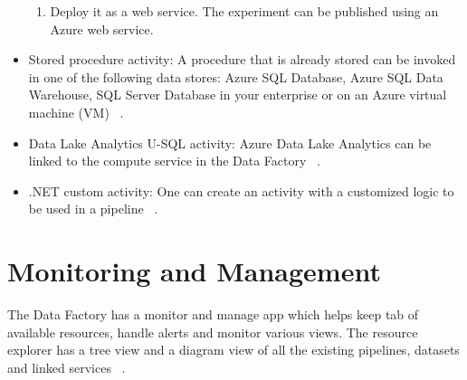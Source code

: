 \documentclass[9pt,twocolumn,twoside]{styles/osajnl}
\begin{document}
\begin{itemize}
\begin{enumerate}
        \item Deploy it as a web service. The experiment can be published using an Azure web service. 
    \end{enumerate}
    \item Stored procedure activity: A procedure that is already stored can be invoked in one of the following data stores:  Azure SQL Database, Azure SQL Data Warehouse, SQL Server Database in your enterprise or on an Azure virtual machine (VM)~\cite{www-microsoft-azure-stored} .
    \item Data Lake Analytics U-SQL activity: Azure Data Lake Analytics can be linked to the compute service in the Data Factory ~\cite{www-microsoft-azure-datalake}.
    \item .NET custom activity: One can create an activity with a customized logic to be used in a pipeline ~\cite{www-microsoft-azure-dotnet}.
\end{itemize}

\section{Monitoring and Management}
The Data Factory has a monitor and manage app which helps keep tab of available resources, handle alerts and monitor various views. The resource explorer has a tree view and a diagram view of all the existing pipelines, datasets and linked services ~\cite{www-microsoft-azure-moniter}.
\end{document}

